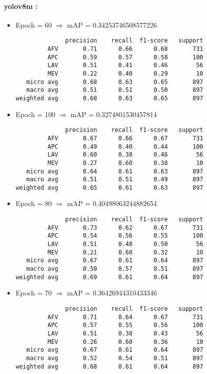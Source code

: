 \paragraph{yolov8m :}
\begin{itemize}
    \item Epoch = 60 $\Rightarrow$ mAP = 0.34253746508577226
          \begin{verbatim}
              precision    recall  f1-score   support
         AFV       0.71      0.66      0.68       731
         APC       0.59      0.57      0.58       100
         LAV       0.51      0.41      0.46        56
         MEV       0.22      0.40      0.29        10
   micro avg       0.68      0.63      0.65       897
   macro avg       0.51      0.51      0.50       897
weighted avg       0.68      0.63      0.65       897
\end{verbatim}

    \item Epoch = 100 $\Rightarrow$ mAP = 0.3274801530457814
          \begin{verbatim}
              precision    recall  f1-score   support
         AFV       0.67      0.66      0.67       731
         APC       0.49      0.40      0.44       100
         LAV       0.60      0.38      0.46        56
         MEV       0.27      0.60      0.38        10
   micro avg       0.64      0.61      0.63       897
   macro avg       0.51      0.51      0.49       897
weighted avg       0.65      0.61      0.63       897
\end{verbatim}

    \item Epoch = 80 $\Rightarrow$ mAP = 0.40498063244882654
          \begin{verbatim}
              precision    recall  f1-score   support
         AFV       0.73      0.62      0.67       731
         APC       0.54      0.56      0.55       100
         LAV       0.51      0.48      0.50        56
         MEV       0.21      0.60      0.32        10
   micro avg       0.67      0.61      0.64       897
   macro avg       0.50      0.57      0.51       897
weighted avg       0.69      0.61      0.64       897
        \end{verbatim}

    \item Epoch = 70 $\Rightarrow$ mAP = 0.36426944310433346
          \begin{verbatim}
              precision    recall  f1-score   support
         AFV       0.71      0.64      0.67       731
         APC       0.57      0.55      0.56       100
         LAV       0.51      0.38      0.43        56
         MEV       0.26      0.60      0.36        10
   micro avg       0.67      0.61      0.64       897
   macro avg       0.52      0.54      0.51       897
weighted avg       0.68      0.61      0.64       897
    \end{verbatim}


\end{itemize}
